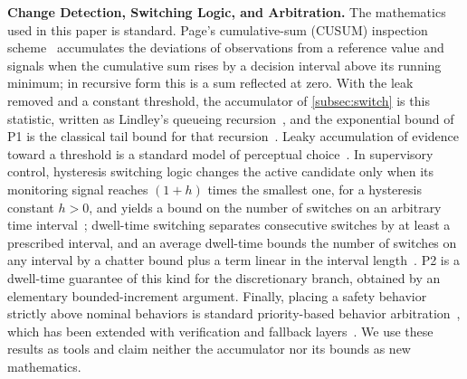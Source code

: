 \noindent\textbf{Change Detection, Switching Logic, and Arbitration.} The mathematics used in this paper is standard. Page's cumulative-sum (CUSUM) inspection scheme~\citep{page1954cusum} accumulates the deviations of observations from a reference value and signals when the cumulative sum rises by a decision interval above its running minimum; in recursive form this is a sum reflected at zero. With the leak removed and a constant threshold, the accumulator of \cref{subsec:switch} is this statistic, written as Lindley's queueing recursion~\citep{lindley1952queue}, and the exponential bound of P1 is the classical tail bound for that recursion~\citep{kingman1970queues}. Leaky accumulation of evidence toward a threshold is a standard model of perceptual choice~\citep{usher2001lca}. In supervisory control, hysteresis switching logic changes the active candidate only when its monitoring signal reaches $(1+h)$ times the smallest one, for a hysteresis constant $h>0$, and yields a bound on the number of switches on an arbitrary time interval~\citep{hespanha2003hysteresis}; dwell-time switching separates consecutive switches by at least a prescribed interval, and an average dwell-time bounds the number of switches on any interval by a chatter bound plus a term linear in the interval length~\citep{hespanha1999dwell}. P2 is a dwell-time guarantee of this kind for the discretionary branch, obtained by an elementary bounded-increment argument. Finally, placing a safety behavior strictly above nominal behaviors is standard priority-based behavior arbitration~\citep{orzechowski2020arbitration}, which has been extended with verification and fallback layers~\citep{spieker2024arbitration}. We use these results as tools and claim neither the accumulator nor its bounds as new mathematics.

